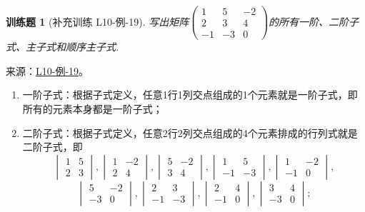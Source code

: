 \documentclass[UTF8,12pt,a4paper,fontset=fandol]{ctexart}
\newtheorem{exercise}{训练题}[section]
\begin{document}
\begin{exercise}[补充训练 L10-例-19]\label{prob:L10-例-19}
写出矩阵$\begin{pmatrix}
            1 & 5 & -2 \\ 2 & 3 & 4 \\ -1 & -3 & 0
        \end{pmatrix}$的所有一阶、二阶子式、主子式和顺序主子式.
\end{exercise}
\noindent 来源：\href{https://github.com/yhwu-is/Linear-Algebra-Left-Undone/blob/new/%E8%AE%B2%E4%B9%89/%E4%B8%93%E9%A2%98/10%20%E8%A1%8C%E5%88%97%E5%BC%8F.tex}{L10-例-19}。
\begin{solve}
\begin{enumerate}
        \item 一阶子式：根据子式定义，任意1行1列交点组成的1个元素就是一阶子式，即所有的元素本身都是一阶子式；

        \item 二阶子式：根据子式定义，任意2行2列交点组成的4个元素排成的行列式就是二阶子式，即
              \[\begin{vmatrix}
                      1 & 5 \\
                      2 & 3
                  \end{vmatrix},\begin{vmatrix}
                      1 & -2 \\
                      2 & 4
                  \end{vmatrix},\begin{vmatrix}
                      5 & -2 \\
                      3 & 4
                  \end{vmatrix},\begin{vmatrix}
                      1  & 5  \\
                      -1 & -3
                  \end{vmatrix},\begin{vmatrix}
                      1  & -2 \\
                      -1 & 0
                  \end{vmatrix},\]\[\begin{vmatrix}
                      5  & -2 \\
                      -3 & 0
                  \end{vmatrix},\begin{vmatrix}
                      2  & 3  \\
                      -1 & -3
                  \end{vmatrix},\begin{vmatrix}
                      2  & 4 \\
                      -1 & 0
                  \end{vmatrix},\begin{vmatrix}
                      3  & 4 \\
                      -3 & 0
                  \end{vmatrix};\]


\end{enumerate}
\end{solve}
\end{document}
